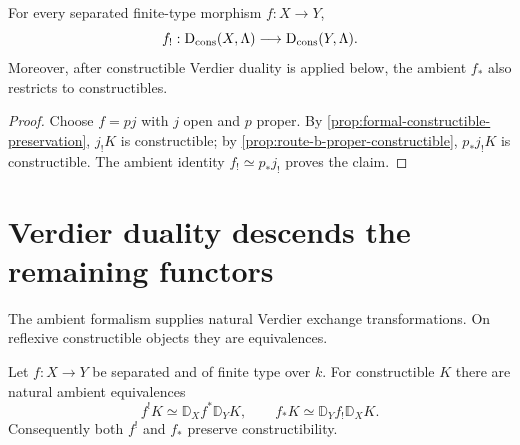 \begin{corollary}
\label{cor:integral-direct-image}
For every separated finite-type morphism \(f:X\to Y\),
\[
 f_!:\mathrm D_{\mathrm{cons}}(X,\Lambda)\longrightarrow\mathrm D_{\mathrm{cons}}(Y,\Lambda).
\]
Moreover, after constructible Verdier duality is applied below, the ambient
\(f_*\) also restricts to constructibles.
\end{corollary}

\begin{proof}
Choose \(f=pj\) with \(j\) open and \(p\) proper.  By
\cref{prop:formal-constructible-preservation}, \(j_!K\) is constructible;
by \cref{prop:route-b-proper-constructible}, \(p_*j_!K\) is constructible.
The ambient identity \(f_!\simeq p_*j_!\) proves the claim.
\end{proof}

\section{Verdier duality descends the remaining functors}

The ambient formalism supplies natural Verdier exchange transformations.
On reflexive constructible objects they are equivalences.

\begin{theorem}
\label{thm:proetale-fupper-shriek}
Let \(f:X\to Y\) be separated and of finite type over \(k\).  For
constructible \(K\) there are natural ambient equivalences
\begin{equation}
\label{eq:six-duality-identities}
 f^!K\simeq\mathbb D_Xf^*\mathbb D_YK,
 \qquad
 f_*K\simeq\mathbb D_Yf_!\mathbb D_XK.
\end{equation}
Consequently both \(f^!\) and \(f_*\) preserve constructibility.
\end{theorem}

